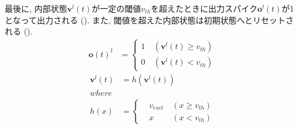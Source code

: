 最後に, 内部状態$\bm{v}^l\left(t\right)$が一定の閾値$v_{th}$を超えたときに出力スパイク$\bm{o}^l\left(t\right)$が1となって出力される ().
また, 閾値を超えた内部状態は初期状態へとリセットされる ().
\begin{equation}
    \begin{split}
      \bm{o}\left(t\right)^{l}&=\left\{
        \begin{alignedat}{2}
          1 &\:\left(\bm{v}^l\left(t\right){\geq}v_{th}\right)\\
          0 &\:\left(\bm{v}^l\left(t\right){<}v_{th}\right)
        \end{alignedat}
      \right. 
    \end{split} \label{eq:outputSpike}
  \end{equation}
  \begin{equation}
    \begin{split}
      \bm{v}^l\left(t\right)&=h\left(\bm{v}^l\left(t\right)\right)\\
    where\\
    h\left(x\right)&=\left\{
      \begin{alignedat}{2}
        &v_{rset} &\:\left(x{\geq}v_{th}\right)\\
        &x &\:\left(x{<}v_{th}\right)
      \end{alignedat}
    \right. 
    \end{split} \label{eq:outputSpike2}
  \end{equation}
